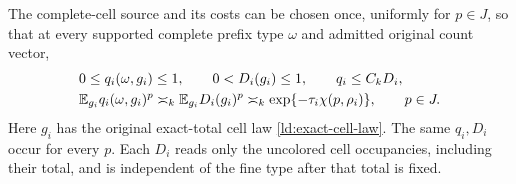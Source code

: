\begin{lemma}
\label{fp:lem:fixed-source-window}
The complete-cell source and its costs can be chosen once, uniformly
for $p\in J$, so that at every supported complete prefix type
$\omega$ and admitted original count vector,
\begin{equation}
 \begin{split}
 &0\le q_i(\omega,g_i)\le1,\qquad
 0<D_i(g_i)\le1,\qquad q_i\le C_kD_i,\\
 &\mathbb E_{g_i}q_i(\omega,g_i)^p
   \asymp_k\mathbb E_{g_i}D_i(g_i)^p
   \asymp_k\exp\{-\tau_i\chi(p,\rho_i)\},\qquad p\in J.
 \end{split}
 \label{fp:eq:actual-window}
\end{equation}
Here $g_i$ has the original exact-total cell law
\eqref{ld:exact-cell-law}. The same $q_i,D_i$ occur for every $p$.
Each $D_i$ reads only the uncolored cell occupancies, including their
total, and is independent of the fine type after that total is fixed.
\end{lemma}
